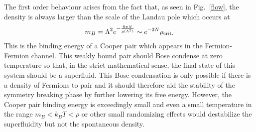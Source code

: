\documentclass[twocolumn,secnumarabic,amssymb, nobibnotes, aps, prd]{revtex4}
\begin{document}
  The first order behaviour arises from the fact that, as  seen in Fig.\ \ref{flow}, 
  the density is always larger than the scale of 
the  Landau pole which occurs at 
\begin{align}\label{landau_pole}
m_B= \Lambda^2 e^{- \frac{8\pi N}{g(\Lambda^2)}  } \sim  e^{-  2N} \rho_{\rm crit.}
\end{align}
This is the binding energy of a Cooper pair which appears in the Fermion-Fermion channel.
This weakly bound pair should Bose condense at zero temperature so that, in the strict mathematical sense,
the final state of this system should be a superfluid.  This Bose condensation is only possible if there is a density of
Fermions to pair and it should therefore aid the stability of the symmetry breaking phase by further lowering its free energy. 
However, the Cooper pair  binding energy is exceedingly small and
even a   small temperature  in the range
$m_B<k_BT<\rho$ or other small randomizing effects 
would destabilize the superfluidity but not the spontaneous density. 
 
\end{document}

